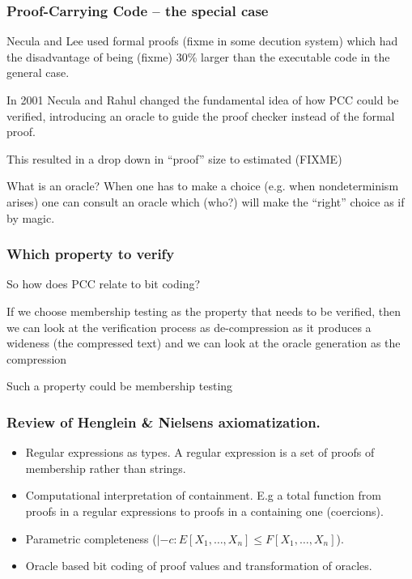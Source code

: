 \documentclass[slidestop,compress,mathserif, xcolor=table]{beamer}
\begin{document}
\begin{frame}
  \frametitle{Proof-Carrying Code -- the special case}

  Necula and Lee used formal proofs (fixme in some decution system) which had
  the disadvantage of being (fixme) 30\% larger than the executable code in the
  general case.

  In 2001 Necula and Rahul\cite{nera2001} changed the fundamental idea of how
  PCC could be verified, introducing an oracle to guide the proof checker
  instead of the formal proof.

  This resulted in a drop down in ``proof'' size to estimated (FIXME)

  
  \begin{block}{What is an oracle?}
    When one has to make a choice (e.g. when nondeterminism arises) one can
    consult an oracle which (who?) will make the ``right'' choice as if by
    magic.
  \end{block}

  
\end{frame}

\begin{frame}
  \frametitle{Which property to verify}
  
  So how does PCC relate to bit coding?

  If we choose membership testing as the property that needs to be verified,
  then we can look at the verification process as de-compression as it produces a
  wideness (the compressed text) and we can look at the oracle generation as the
  compression 
  
  Such a property could be membership testing
  
\end{frame}


\begin{frame}
  \frametitle{Review of Henglein \& Nielsens\cite{heni2010} axiomatization.}
  \begin{itemize}
  \item Regular expressions as types. A regular expression is a set of proofs of
    membership rather than strings.
  \item Computational interpretation of containment. E.g a total function from
    proofs in a regular expressions to proofs in a containing one (coercions).
  \item Parametric completeness ($|- c : E[X_1, \ldots, X_n] \leq F[X_1,
    \ldots, X_n]$).
  \item Oracle based bit coding of proof values and transformation of oracles.
  \end{itemize}
\end{frame}
\end{document}
